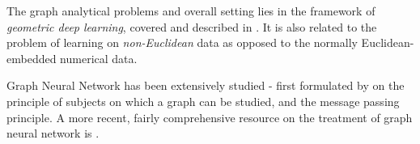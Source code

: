 \begin{description}[style=unboxed,leftmargin=0cm]
    \item[Graph Analysis] The graph analytical problems and overall setting lies in the framework of \textit{geometric deep learning}, covered and described in \cite{bronstein2021geometricdeeplearninggrids,Bronstein_2017}. It is also related to the problem of learning on \textit{non-Euclidean} data as opposed to the normally Euclidean-embedded numerical data. 
    \item[GNN] Graph Neural Network has been extensively studied - first formulated by \cite{Scar04} on the principle of subjects on which a graph can be studied, and the message passing principle. A more recent, fairly comprehensive resource on the treatment of graph neural network is \cite{GRP_Hamilton}. 
\end{description}